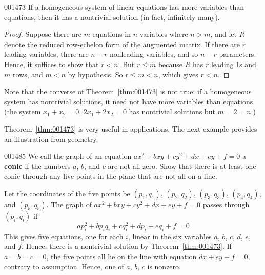 \begin{theorem}{}{001473}
If a homogeneous system of linear equations has more variables than equations, then it has a nontrivial solution (in fact, infinitely many).
\end{theorem}

\begin{proof}
Suppose there are $m$ equations in $n$ variables where $n > m$, and let $R$ denote the reduced row-echelon form of the augmented matrix. If there are $r$ leading variables, there are $n - r$ nonleading variables, and so $n - r$ parameters. Hence, it suffices to show that $r < n$. But $r \leq m$ because $R$ has $r$ leading 1s and $m$ rows, and $m < n$ by hypothesis. So $r \leq m < n$, which gives $r < n$.
\end{proof}

Note that the converse of Theorem~\ref{thm:001473} is not true: if a homogeneous system has nontrivial solutions, it need not have more variables than equations (the system $x_1 + x_2 = 0$, $2x_1 + 2x_2 = 0$ has nontrivial solutions but $m = 2 = n$.)

Theorem~\ref{thm:001473} is very useful in applications. The next example provides an illustration from geometry.

\begin{example}{}{001485}
We call the graph of an equation $ax^2 + bxy + cy^2 + dx + ey + f = 0$ a \textbf{conic} if the numbers $a$, $b$, and $c$ are not all zero. Show that there is at least one conic through any five points in the plane that are not all on a line.

\begin{solution}
Let the coordinates of the five points be $(p_1, q_1)$, $(p_2, q_2)$, $(p_3, q_3)$, $(p_4, q_4)$, and $(p_5, q_5)$. The graph of $ax^2 + bxy + cy^2 + dx + ey + f = 0$ passes through $(p_i, q_i)$ if
\begin{equation*}
ap_i^2 + bp_iq_i + cq_i^2 + dp_i + eq_i + f = 0
\end{equation*}
This gives five equations, one for each $i$, linear in the six variables $a$, $b$, $c$, $d$, $e$, and $f$. Hence, there is a nontrivial solution by Theorem~\ref{thm:001473}. If $a = b = c = 0$, the five points all lie on the line with equation $dx + ey + f = 0$, contrary to assumption. Hence, one of $a$, $b$, $c$ is nonzero.
\end{solution}
\end{example}

